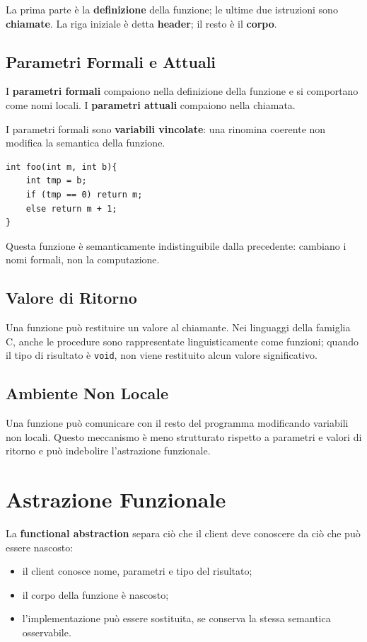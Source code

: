 \documentclass{article}
\begin{document}
La prima parte è la \textbf{definizione} della funzione; le ultime due istruzioni sono \textbf{chiamate}. La riga iniziale è detta \textbf{header}; il resto è il \textbf{corpo}.

\subsection{Parametri Formali e Attuali}

I \textbf{parametri formali} compaiono nella definizione della funzione e si comportano come nomi locali. I \textbf{parametri attuali} compaiono nella chiamata.

I parametri formali sono \textbf{variabili vincolate}: una rinomina coerente non modifica la semantica della funzione.

\begin{lstlisting}
int foo(int m, int b){
    int tmp = b;
    if (tmp == 0) return m;
    else return m + 1;
}
\end{lstlisting}

Questa funzione è semanticamente indistinguibile dalla precedente: cambiano i nomi formali, non la computazione.

\subsection{Valore di Ritorno}

Una funzione può restituire un valore al chiamante. Nei linguaggi della famiglia C, anche le procedure sono rappresentate linguisticamente come funzioni; quando il tipo di risultato è \texttt{void}, non viene restituito alcun valore significativo.

\subsection{Ambiente Non Locale}

Una funzione può comunicare con il resto del programma modificando variabili non locali. Questo meccanismo è meno strutturato rispetto a parametri e valori di ritorno e può indebolire l'astrazione funzionale.

\section{Astrazione Funzionale}

La \textbf{functional abstraction} separa ciò che il client deve conoscere da ciò che può essere nascosto:
\begin{itemize}
  \item il client conosce nome, parametri e tipo del risultato;
  \item il corpo della funzione è nascosto;
  \item l'implementazione può essere sostituita, se conserva la stessa semantica osservabile.
\end{itemize}
\end{document}
